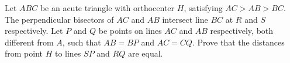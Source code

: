 Let $ABC$ be an acute triangle with orthocenter $H$, satisfying $AC > AB > BC$.
The perpendicular bisectors of $AC$ and $AB$ intersect line $BC$ at $R$ and $S$ respectively.
Let $P$ and $Q$ be points on lines $AC$ and $AB$ respectively, both different from $A$,
such that $AB = BP$ and $AC = CQ$.
Prove that the distances from point $H$ to lines $SP$ and $RQ$ are equal.
